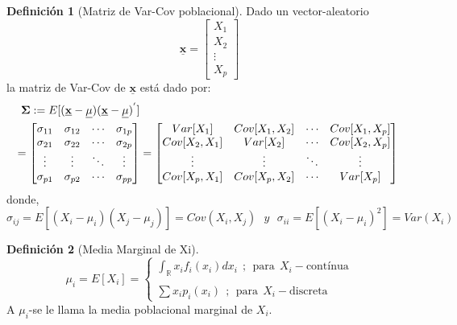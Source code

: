 \documentclass[
]{book}
\theoremstyle{definition}
\newtheorem{definition}{Definición}[chapter]
\theoremstyle{definition}
\theoremstyle{definition}
\theoremstyle{definition}
\theoremstyle{remark}
\begin{document}
\begin{definition}[Matriz de Var-Cov poblacional]
\protect\hypertarget{def:matriz-var-cov}{}\label{def:matriz-var-cov}Dado un vector-aleatorio
\[
\underline{\mathbf{x}}=\begin{bmatrix}
X_1\\X_2\\ \vdots \\ X_p
\end{bmatrix}
\]
la matriz de Var-Cov de \(\underline{\mathbf{x}}\) está dado por:
\begin{align*}
\mathbf{\Sigma}&:=E[(\underline{\mathbf{x}}-\mathbf{\underline{\mu}})(\underline{\mathbf{x}}-\mathbf{\underline{\mu}})^{'}]\\
&\hspace{-0.5cm}= \begin{bmatrix}
\sigma_{11} & \sigma_{12}& \cdots &  \sigma_{1p}\\
\sigma_{21} & \sigma_{22}& \cdots &  \sigma_{2p}\\
\vdots & \vdots & \ddots & \vdots\\
\sigma_{p1}& \sigma_{p2}& \cdots &  \sigma_{pp}
\end{bmatrix}=\begin{bmatrix}
Var[X_1]& Cov[X_1,X_2]& \cdots & Cov[X_1,X_p]\\
Cov[X_2,X_1]& Var[X_2]& \cdots & Cov[X_2,X_p]\\
\vdots & \vdots & \ddots & \vdots\\
Cov[X_p,X_1]& Cov[X_p,X_2]& \cdots & Var[X_p]
\end{bmatrix}
\end{align*}
donde,
\[
\sigma_{ij}=E[(X_i-\mu_i)(X_j-\mu_j)]=Cov(X_i,X_j) \ \ \  y \ \ \ \sigma_{ii}=E[(X_i-\mu_i)^2]=Var(X_i)
\]
\end{definition}

\begin{definition}[Media Marginal de Xi]
\protect\hypertarget{def:media-marginal}{}\label{def:media-marginal}\[
\mu_i=E[X_i]=\begin{cases}
\int_{\mathbb{R}}x_{i}f_{i}(x_{i})dx_{i} \ \ ; \ \ \text{para} \ \ X_{i}-\text{contínua}\\ \\
\sum x_{i}p_{i}(x_{i})\ \ ; \ \ \text{para} \ \ X_{i}-\text{discreta}
\end{cases}
\]
A \(\mu_i\)-se le llama la media poblacional marginal de \(X_i\).
\end{definition}
\end{document}
